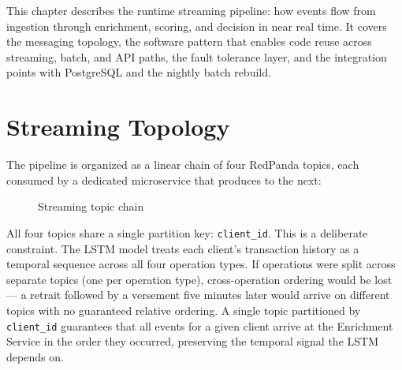 This chapter describes the runtime streaming pipeline: how events flow from
ingestion through enrichment, scoring, and decision in near real time. It covers
the messaging topology, the software pattern that enables code reuse across
streaming, batch, and API paths, the fault tolerance layer, and the integration
points with PostgreSQL and the nightly batch rebuild.

\section{Streaming Topology}

The pipeline is organized as a linear chain of four RedPanda topics, each
consumed by a dedicated microservice that produces to the next:

\begin{figure}[H]
\centering
{}
\caption{Streaming topic chain}
\label{fig:topic-chain}
\end{figure}

All four topics share a single partition key: \texttt{client\_id}. This is a
deliberate constraint. The LSTM model treats each client's transaction history
as a temporal sequence across all four operation types. If operations were split
across separate topics (one per operation type), cross-operation ordering would
be lost --- a retrait followed by a versement five minutes later would arrive on
different topics with no guaranteed relative ordering. A single topic partitioned
by \texttt{client\_id} guarantees that all events for a given client arrive at
the Enrichment Service in the order they occurred, preserving the temporal
signal the LSTM depends on.

